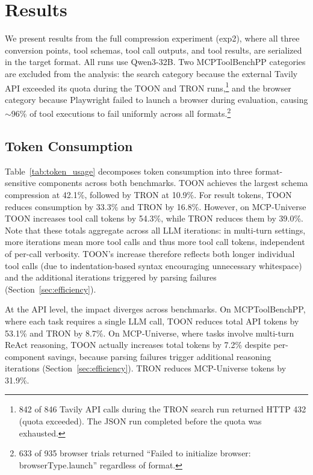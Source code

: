 \documentclass[11pt]{article}
\begin{document}
\section{Results}
\label{sec:results}

We present results from the full compression experiment (exp2), where all three conversion points, tool schemas, tool call outputs, and tool results, are serialized in the target format. All runs use Qwen3-32B. Two MCPToolBenchPP categories are excluded from the analysis: the search category because the external Tavily API exceeded its quota during the TOON and TRON runs,\footnote{842 of 846 Tavily API calls during the TRON search run returned HTTP 432 (quota exceeded). The JSON run completed before the quota was exhausted.} and the browser category because Playwright failed to launch a browser during evaluation, causing $\sim$96\% of tool executions to fail uniformly across all formats.\footnote{633 of 935 browser trials returned ``Failed to initialize browser: browserType.launch'' regardless of format.}

\subsection{Token Consumption}
\label{sec:token_consumption}

Table~\ref{tab:token_usage} decomposes token consumption into three format-sensitive components across both benchmarks. TOON achieves the largest schema compression at 42.1\%, followed by TRON at 10.9\%. For result tokens, TOON reduces consumption by 33.3\% and TRON by 16.8\%. However, on MCP-Universe TOON increases tool call tokens by 54.3\%, while TRON reduces them by 39.0\%. Note that these totals aggregate across all LLM iterations: in multi-turn settings, more iterations mean more tool calls and thus more tool call tokens, independent of per-call verbosity. TOON's increase therefore reflects both longer individual tool calls (due to indentation-based syntax encouraging unnecessary whitespace) and the additional iterations triggered by parsing failures (Section~\ref{sec:efficiency}).

At the API level, the impact diverges across benchmarks. On MCPToolBenchPP, where each task requires a single LLM call, TOON reduces total API tokens by 53.1\% and TRON by 8.7\%. On MCP-Universe, where tasks involve multi-turn ReAct reasoning, TOON actually increases total tokens by 7.2\% despite per-component savings, because parsing failures trigger additional reasoning iterations (Section~\ref{sec:efficiency}). TRON reduces MCP-Universe tokens by 31.9\%.
\end{document}
